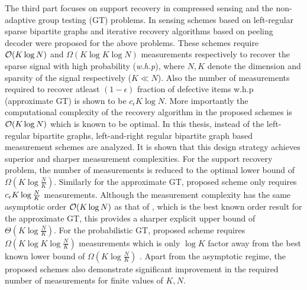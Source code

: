 \indent The third part focuses on support recovery in compressed sensing and the non-adaptive group testing (GT) problems. In \cite{li2015subdraft,lee2015saffron} sensing schemes based on left-regular sparse bipartite graphs and iterative recovery algorithms based on peeling decoder were proposed for the above problems. These schemes require $\mathcal{O}(K \log N)$ and $ \Omega(K\log K\log N)$ measurements respectively to recover the sparse signal with high probability (\emph{w.h.p}), where $N,K$ denote the dimension and sparsity of the signal respectively ($K\ll N$). Also the number of measurements required to recover atleast $(1-\epsilon)$ fraction of defective items w.h.p (approximate GT) is shown to be $c_\epsilon K\log N$. More importantly the computational complexity of the recovery algorithm in the proposed schemes is $\mathcal{O}(K \log N)$ which is known to be optimal. In this thesis, instead of the left-regular bipartite graphs, left-and-right regular bipartite graph based measurement schemes are analyzed. It is shown that this design strategy achieves superior and sharper measurement complexities. For the support recovery problem, the number of measurements is reduced to the optimal lower bound of $\Omega\left(K \log \frac{N}{K} \right)$. Similarly for the approximate GT, proposed scheme only requires $c_{\epsilon} K\log \frac{N}{K}$ measurements. Although the measurement complexity has the same asymptotic order $\mathcal{O}(K\log N)$ as that of \cite{lee2015saffron}, which is the best known order result for the approximate GT, this provides a sharper explicit upper bound of $\Theta(K\log \frac{N}{K})$. For the probabilistic GT, proposed scheme requires $\Omega(K\log K \log \frac{N}{K})$ measurements which is only $\log K$ factor away from the best known lower bound of $\Omega(K\log \frac{N}{K})$ \cite{chan2014non}. Apart from the asymptotic regime, the proposed schemes also demonstrate significant improvement in the required number of measurements for finite values of $K,N$. 


